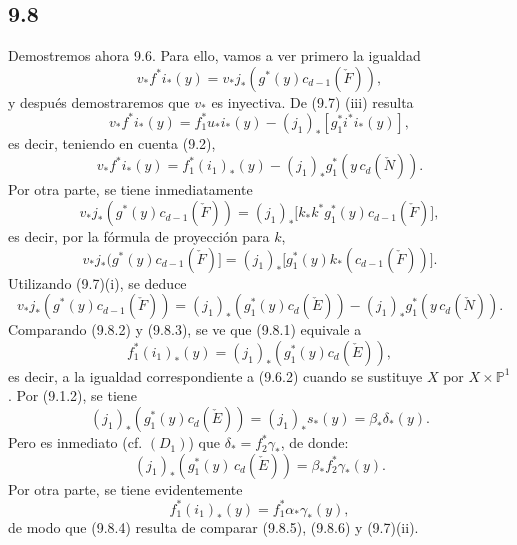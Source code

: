 \subsection*{9.8}

Demostremos ahora 9.6. Para ello, vamos a ver primero la igualdad
\[
v_*f^*i_*(y)=v_*j_*(g^*(y)c_{d-1}(\check F)),
\tag{9.8.1}
\]
y después demostraremos que $v_*$ es inyectiva. De (9.7) (iii) resulta
\[
v_*f^*i_*(y)=f_1^*u_*i_*(y)-(j_1)_*[g_1^*i^*i_*(y)],
\]
es decir, teniendo en cuenta (9.2),
\[
v_*f^*i_*(y)=f_1^*(i_1)_*(y)-(j_1)_*g_1^*(y\,c_d(\check N)).
\tag{9.8.2}
\]
Por otra parte, se tiene inmediatamente
\[
v_*j_*(g^*(y)c_{d-1}(\check F))
=(j_1)_*\bigl[k_*k^*g_1^*(y)c_{d-1}(\check F)\bigr],
\]
es decir, por la fórmula de proyección para $k$,
\[
v_*j_*(g^*(y)c_{d-1}(\check F)]
=(j_1)_*\bigl[g_1^*(y)k_*(c_{d-1}(\check F))\bigr].
\]
Utilizando (9.7)(i), se deduce
\[
v_*j_*(g^*(y)c_{d-1}(\check F))
=(j_1)_*(g_1^*(y)c_d(\check E))-(j_1)_*g_1^*(y\,c_d(\check N)).
\tag{9.8.3}
\]
Comparando (9.8.2) y (9.8.3), se ve que (9.8.1) equivale a
\[
f_1^*(i_1)_*(y)=(j_1)_*(g_1^*(y)c_d(\check E)),
\tag{9.8.4}
\]
es decir, a la igualdad correspondiente a (9.6.2) cuando se sustituye $X$ por $X\times\mathbb P^1$. Por (9.1.2), se tiene
\[
(j_1)_*(g_1^*(y)c_d(\check E))=(j_1)_*s_*(y)=\beta_*\delta_*(y).
\]
Pero es inmediato (cf. $(D_1)$) que $\delta_*=f_2^*\gamma_*$, de donde:
\[
(j_1)_*(g_1^*(y)\,c_d(\check E))=\beta_*f_2^*\gamma_*(y).
\tag{9.8.5}
\]
Por otra parte, se tiene evidentemente
\[
f_1^*(i_1)_*(y)=f_1^*\alpha_*\gamma_*(y),
\tag{9.8.6}
\]
de modo que (9.8.4) resulta de comparar (9.8.5), (9.8.6) y (9.7)(ii).
